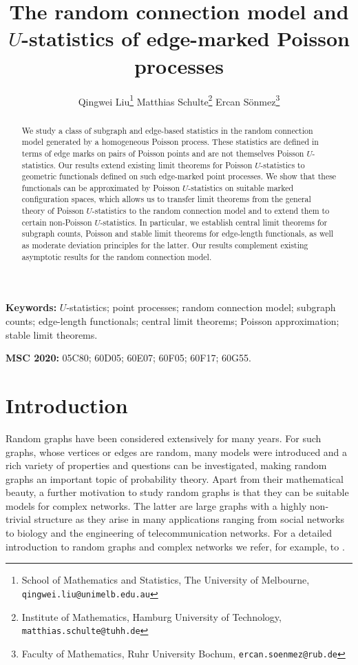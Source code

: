 \documentclass{article}
\title{The random connection model and $U$-statistics of edge-marked Poisson processes}
\author{
  Qingwei Liu\thanks{School of Mathematics and Statistics, The University of Melbourne, \texttt{qingwei.liu@unimelb.edu.au}}
  \quad
  Matthias Schulte\thanks{Institute of Mathematics, Hamburg University of Technology, \texttt{matthias.schulte@tuhh.de}}
  \quad
  Ercan Sönmez\thanks{Faculty of Mathematics, Ruhr University Bochum, \texttt{ercan.soenmez@rub.de}}
}
\date{}
\theoremstyle{definition}
\numberwithin{equation}{section}
\theoremstyle{remark}
\begin{document}
\maketitle

\begin{abstract}
We study a class of subgraph and edge-based statistics in the random connection model generated by a homogeneous Poisson process. These statistics are defined in terms of edge marks on pairs of Poisson points and are not themselves Poisson $U$-statistics. Our results extend existing limit theorems for Poisson $U$-statistics to geometric functionals defined on such edge-marked point processes. We show that these functionals can be approximated by Poisson $U$-statistics on suitable marked configuration spaces, which allows us to transfer limit theorems from the general theory of Poisson $U$-statistics to the random connection model and to extend them to certain non-Poisson $U$-statistics. In particular, we establish central limit theorems for subgraph counts, Poisson and stable limit theorems for edge-length functionals, as well as moderate deviation principles for the latter. Our results complement existing asymptotic results for the random connection model.


\end{abstract}
\noindent\textbf{Keywords:} $U$-statistics; point processes; random connection model; subgraph counts; edge-length functionals; central limit theorems; Poisson approximation; stable limit theorems.

\medskip
\noindent\textbf{MSC 2020:} 05C80; 60D05; 60E07; 60F05; 60F17; 60G55. 

\section{Introduction}

Random graphs have been considered extensively for many years. For such graphs, whose vertices or edges are random, many models were introduced and a rich variety of properties and questions can be investigated, making random graphs an important topic of probability theory. Apart from their mathematical beauty, a further motivation to study random graphs is that they can be suitable models for complex networks. The latter are large graphs with a highly non-trivial structure as they arise in many applications ranging from social networks to biology and the engineering of telecommunication networks. For a detailed introduction to random graphs and complex networks we refer, for example, to \cite{van_der_Hofstad_book}.
\end{document}
